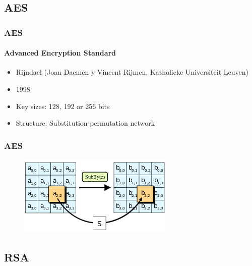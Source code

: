 \documentclass{beamer}
\begin{document}
\subsection{AES}

\begin{frame}
\frametitle{AES}
\framesubtitle{Advanced Encryption Standard}
\begin{itemize}
\item Rijndael (Joan Daemen y Vincent Rijmen, Katholieke Universiteit Leuven)
\item 1998
\item Key sizes: 128, 192 or 256 bits
\item Structure: Substitution-permutation network
\end{itemize}
\end{frame}

\begin{frame}
\frametitle{AES}
\begin{figure}
\includegraphics[width=0.6\linewidth]{aes.png}
\end{figure}
\end{frame}

\subsection{RSA} %
\end{document}
